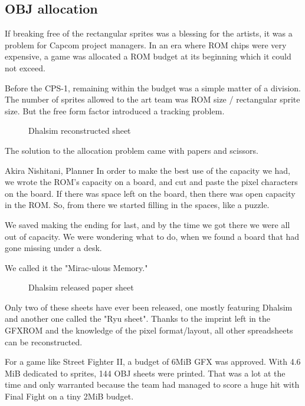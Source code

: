 \subsection{OBJ allocation}

If breaking free of the rectangular sprites was a blessing for the artists, it was a problem for Capcom project managers. In an era where ROM chips were very expensive, a game was allocated a ROM budget at its beginning which it could not exceed.


Before the CPS-1, remaining within the budget was a simple matter of a division. The number of sprites allowed to the art team was ROM size / rectangular sprite size. But the free form factor introduced a tracking problem.



 \begin{figure}[H]
\caption*{Dhalsim reconstructed sheet}
\end{figure}

The solution to the allocation problem came with papers and scissors.

\begin{q}{Akira Nishitani, Planner \cite{sf2devinterview}}
In order to make the best use of the capacity we had, we wrote the ROM’s capacity on a board, and cut and paste the pixel characters on the board. If there was space left on the board, then there was open capacity in the ROM. So, from there we started filling in the spaces, like a puzzle. 

We saved making the ending for last, and by the time we got there we were all out of capacity. We were wondering what to do, when we found a board that had gone missing under a desk.

We called it the "Mirac-ulous Memory."
\end{q}



 \begin{figure}[H]
\caption*{Dhalsim released paper sheet}
\end{figure}

Only two of these sheets have ever been released, one mostly featuring Dhalsim\cite{ffdevinterview} and another one called the "Ryu sheet"\cite{htmcc}. Thanks to the imprint left in the GFXROM and the knowledge of the pixel format/layout, all other spreadsheets can be reconstructed. 



For a game like Street Fighter II, a budget of 6MiB GFX was approved. With 4.6 MiB dedicated to sprites, 144 OBJ sheets were printed. That was a lot at the time and only warranted because the team had managed to score a huge hit with Final Fight on a tiny 2MiB budget\cite{gameMaestro4}. 





